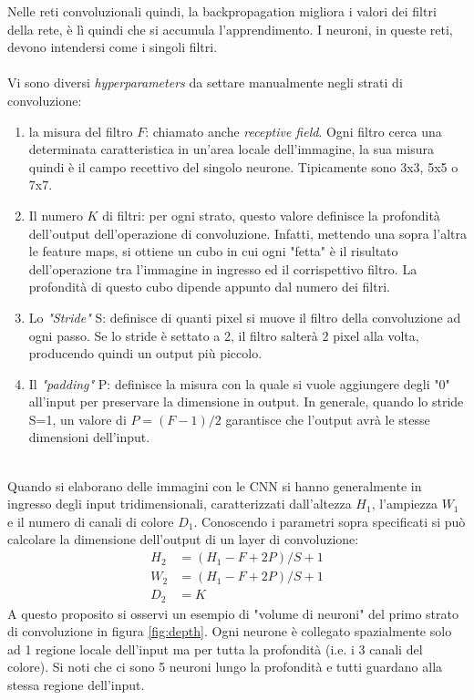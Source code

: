Nelle reti convoluzionali quindi, la backpropagation migliora i valori dei filtri della rete, è lì quindi che si accumula l'apprendimento. I neuroni, in queste reti, devono intendersi come i singoli filtri.\\
\\
Vi sono diversi \emph{hyperparameters} da settare manualmente negli strati di convoluzione: 
\begin{enumerate}
\item la misura del filtro $F$: chiamato anche \emph{receptive field}. Ogni filtro cerca una determinata caratteristica in un'area locale dell'immagine, la sua misura quindi è il campo recettivo del singolo neurone. Tipicamente sono 3x3, 5x5 o 7x7.

\item Il numero $K$ di filtri: per ogni strato, questo valore definisce la profondità dell'output dell'operazione di convoluzione. Infatti, mettendo una sopra l'altra le feature maps, si ottiene un cubo in cui ogni "fetta" è il risultato dell'operazione tra l'immagine in ingresso ed il corrispettivo filtro. La profondità di questo cubo dipende appunto dal numero dei filtri. 

\item Lo \emph{"Stride"} S: definisce di quanti pixel si muove il filtro della convoluzione ad ogni passo. Se lo stride è settato a 2, il filtro salterà 2 pixel alla volta, producendo quindi un output più piccolo. 

\item Il \emph{"padding"} P: definisce la misura con la quale si vuole aggiungere degli "0" all'input per preservare la dimensione in output. In generale, quando lo stride S=1, un valore di  $P = (F - 1)/2$ garantisce che l'output avrà le stesse dimensioni dell'input. 
\end{enumerate}
\\
Quando si elaborano delle immagini con le CNN si hanno generalmente in ingresso degli input tridimensionali, caratterizzati dall'altezza $H_1$, l'ampiezza $W_1$ e il numero di canali di colore $D_1$. Conoscendo i parametri sopra specificati si può calcolare la dimensione dell'output di un layer di convoluzione: 
\begin{align*}
H_2 &= (H_1 - F + 2P)/S + 1\\
W_2 &= (H_1 - F + 2P)/S + 1\\
D_2 &= K
\end{align*}
A questo proposito si osservi un esempio di "volume di neuroni" del primo strato di convoluzione in figura \ref{fig:depth}. Ogni neurone è collegato spazialmente solo ad 1 regione locale dell'input ma per tutta la profondità (i.e. i 3 canali del colore). Si noti che ci sono 5 neuroni lungo la profondità e tutti guardano alla stessa regione dell'input.
